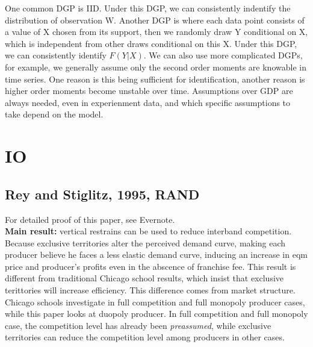 \documentclass{book}
\theoremstyle{plain}
\theoremstyle{definition}
\begin{document}
One common DGP is IID. Under this DGP, we can consistently indentify the distribution of observation W. Another DGP is where each data point consists of a value of X chosen from its support, then we randomly draw Y conditional on X, which is independent from other draws conditional on this X. Under this DGP, we can consistently identify $F(Y|X)$. We can also use more complicated DGPs, for example, we generally assume only the second order moments are knowable in time series. One reason is this being sufficient for identification, another reason is higher order moments become unstable over time. Assumptions over GDP are always needed, even in experienment data, and which specific assumptions to take depend on the model.









\chapter{IO} %
\label{cha:io}

\section{Rey and Stiglitz, 1995, RAND} %
\label{sec:rey_and_stiglitz_1995_rand}

\textbf{}

For detailed proof of this paper, see Evernote.\\

\textbf{Main result:}
vertical restrains can be used to reduce interband competition. Because exclusive territories alter the perceived demand curve, making each producer believe he faces a less elastic demand curve, inducing an increase in eqm price and producer's profits even in the abscence of franchise fee. This result is different from traditional Chicago school results, which insist that exclusive terittories will increase efficiency. This difference comes from market structure. Chicago schools investigate in full competition and full monopoly producer cases, while this paper looks at duopoly producer. In full competition and full monopoly case, the competition level has already been \textit{preassumed}, while exclusive territories can reduce the competition level among producers in other cases.\\
\end{document}
